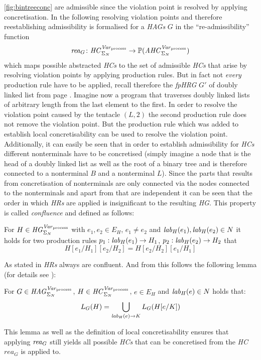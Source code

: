	\ref{fig:bintreeconc} are admissible since the violation point is resolved
	by applying concretisation. In the following resolving violation points and
	therefore reestablishing admissibility is formalised for a \emph{\acp{HAG}}
	$G$ in the \enquote{re-admissibility} function
	\begin{equation*}
		\mathit{rea}_{G}\colon\mathit{HC}_{\Sigma_{N}}^{\mathit{Var}_{\text{process}}}\rightarrow\mathbb{P}(\mathit{AHC}_{\Sigma_{N}}^{\mathit{Var}_{\text{process}}})
	\end{equation*}
	which maps possible abstracted \emph{\acp{HC}} to the set of admissible
	\emph{\acp{HC}} that arise by resolving violation points by applying
	production rules. But in fact not \emph{every} production rule have to be
	applied, recall therefore the \emph{\ac{fpHRG}} $G'$ of doubly linked list
	from page \pageref{eq:G'}. Imagine now a program that traverses doubly
	linked lists of arbitrary length from the last element to the first. In
	order to resolve the violation point caused by the tentacle $(L,2)$ the
	second production rule does not remove the violation point.
	But the production rule which was added to establish local
	concretisability can be used to resolve the violation point. Additionally,
	it can easily be seen that in order to establish admissibility for
	\emph{\acp{HC}} different nonterminals have to be concretised (simply
	imagine a node that is the head of a doubly linked list as well as the root
	of a binary tree and is therefore connected to a nonterminal $B$ and a
	nonterminal $L$).  Since the parts that results from concretisation of
	nonterminals are only connected via the nodes connected to the nonterminals
	and apart from that are independent it can be seen that the order in which
	\emph{\acp{HR}} are applied is insignificant to the resulting
	\emph{\ac{HG}}. This property is called \emph{confluence} and defined as
	follows:
	\begin{definition}[Confluence]
		For $H\in\mathit{HG}_{\Sigma_{N}}^{\mathit{Var}_{\text{process}}}$ with $e_1,e_2\in E_{H}$, $e_1\neq e_2$ and $\mathit{lab}_{H}(e_1),
		\mathit{lab}_{H}(e_2)\in N$ it holds for two production rules
		$p_1:\mathit{lab}_{H}(e_1)\rightarrow H_1$, $p_2:\mathit{lab}_{H}(e_2)\rightarrow H_2$
		that
		\begin{equation*}
			H[e_1/H_1][e_2/H_2] = H[e_2/H_2][e_1/H_1]
		\end{equation*}
	\end{definition}
	As stated in \cite[p. 105]{HandbookGraphGrammars} \emph{\acp{HR}} always are
	confluent. And from this follows the following lemma (for details see
	\cite{fmsd}):
	\begin{lemma}
		\label{theo:overapprox}
		For $G\in\mathit{HAG}_{\Sigma_{N}}^{\mathit{Var}_{\text{process}}}$, $H\in\mathit{HC}_{\Sigma_{N}}^{\mathit{Var}_{\text{process}}}$, $e\in E_{H}$ and $\mathit{lab}_{H}(e)\in N$ holds
		that:
		\begin{equation*}
			L_{G}(H) = \bigcup_{\mathit{lab}_{H}(e)\rightarrow K} L_{G}(H[e/K])
		\end{equation*}
	\end{lemma}
	This lemma as well as the definition of local concretisability ensures that
	applying $\mathit{rea}_{G}$ still yields all possible \emph{\acp{HC}} that can be
	concretised from the \emph{\ac{HC}} $rea_{G}$ is applied to.
